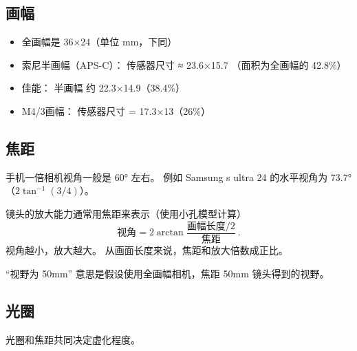 
\subsection{画幅}
\begin{itemize}
\item 全画幅是 36×24（单位 mm，下同）
\item 索尼半画幅（APS-C）： 传感器尺寸 ≈ 23.6×15.7 （面积为全画幅的 42.8\%）
\item 佳能： 半画幅 约 22.3×14.9（38.4\%）
\item M4/3画幅： 传感器尺寸 = 17.3×13（26\%）
\end{itemize}

\subsection{焦距}
手机一倍相机视角一般是 60° 左右。 例如 Samsung s ultra 24 的水平视角为 73.7°（$2\tan^{-1}(3/4)$）。

镜头的放大能力通常用焦距来表示（使用小孔模型计算）
\begin{equation}
\text{视角} = 2\arctan{\frac{\text{画幅长度/2}}{\text{焦距}}}~.
\end{equation}
视角越小，放大越大。 从画面长度来说，焦距和放大倍数成正比。

“视野为 50mm” 意思是假设使用全画幅相机，焦距 50mm 镜头得到的视野。

\subsection{光圈}
光圈和焦距共同决定虚化程度。
